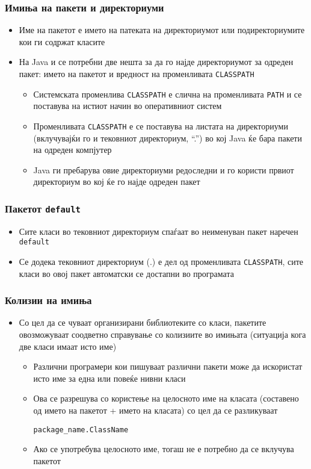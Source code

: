 \begin{frame}\frametitle{Имиња на пакети и директориуми}

\begin{itemize}
\item
  Име на пакетот е името на патеката на директориумот или подиректориумите кои
  ги содржат класите
\item
  На Java и се потребни две нешта за да го најде директориумот за одреден пакет:
  името на пакетот и вредност на променливата \texttt{CLASSPATH}
  \begin{itemize}
  \item
    Системската променлива \texttt{CLASSPATH} е слична на променливата
    \texttt{PATH} и се поставува на истиот начин во оперативниот систем
  \item
    Променливата \texttt{CLASSPATH} е се поставува на листата на директориуми
    (вклучувајќи го и тековниот директориум, ``.'') во кој Java ќе бара пакети
    на одреден компјутер
  \item
    Java ги пребарува овие директориуми редоследни и го користи првиот
    директориум во кој ќе го најде одреден пакет
  \end{itemize}
\end{itemize}
\end{frame}

\begin{frame}\frametitle{Пакетот \texttt{default}}

\begin{itemize}
\item
  Сите класи во тековниот директориум спаѓаат во неименуван пакет наречен \texttt{default}
\item
  Се додека тековниот директориум (.) е дел од променливата \texttt{CLASSPATH},
  сите класи во овој пакет автоматски се достапни во програмата
\end{itemize}
\end{frame}

\begin{frame}[fragile]\frametitle{Колизии на имиња}

\begin{itemize}
\item
  Со цел да се чуваат организирани библиотеките со класи, пакетите овозможуваат
  соодветно справување со колизиите во имињата (ситуација кога две класи имаат
  исто име)
  \begin{itemize}
  \item
    Различни програмери кои пишуваат различни пакети може да искористат
    исто име за една или повеќе нивни класи
  \item
    Ова се разрешува со користење на целосното име на класата (составено од
    името на пакетот + името на класата) со цел да се разликуваат
\begin{verbatim}
package_name.ClassName
\end{verbatim}
  \item
    Ако се употребува целосното име, тогаш не е потребно да се вклучува
    пакетот
  \end{itemize}
\end{itemize}

\end{frame}

